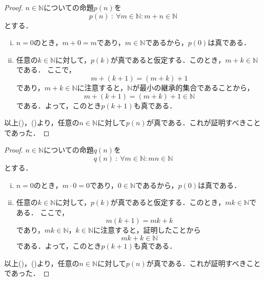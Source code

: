 \documentclass[a4paper,10pt,fleqn]{ltjsarticle}
\begin{document}
\begin{tleftbar}
    \begin{proof}
        $n \in \mathbb{N}$についての命題$p(n)$を
        \[
            p(n) ~{:}~ \forall m \in \mathbb{N} \colon  m+n \in \mathbb{N}
        \]
        とする．
        \begin{enumerate}[(i)]
            \item $n=0$のとき，$m+0=m$であり，$m \in \mathbb{N}$であるから，$p(0)$は真である．
            \item 任意の$k \in \mathbb{N}$に対して，$p(k)$が真であると仮定する．このとき，$m+k \in \mathbb{N}$である．
                  ここで，
                  \[
                      m+(k+1)=(m+k)+1
                  \] であり，$m+k \in \mathbb{N}$に注意すると，$\mathbb{N}$が最小の継承的集合であることから，
                  \[
                      m+(k+1)=(m+k)+1  \in \mathbb{N}
                  \]
                  である．よって，このとき$p(k+1)$も真である．
        \end{enumerate}
        以上()，()より，任意の$n \in \mathbb{N}$に対して$p(n)$が真である．これが証明すべきことであった．
    \end{proof}
\end{tleftbar}



\begin{tleftbar}
    \begin{proof}
        $n \in \mathbb{N}$についての命題$q(n)$を
        \[
            q(n) ~{:}~ \forall m \in \mathbb{N} \colon  mn \in \mathbb{N}
        \]
        とする．
        \begin{enumerate}[(i)]
            \item $n=0$のとき，$m \cdot 0=0$であり，$0 \in \mathbb{N}$であるから，$p(0)$は真である．
            \item 任意の$k \in \mathbb{N}$に対して，$p(k)$が真であると仮定する．このとき，$mk \in \mathbb{N}$である．
                  ここで，
                  \[
                      m(k+1)=mk + k
                  \] であり，$mk \in \mathbb{N}$，$k \in \mathbb{N}$に注意すると，証明したことから
                  \[
                      mk + k   \in \mathbb{N}
                  \]
                  である．よって，このとき$p(k+1)$も真である．
        \end{enumerate}
        以上()，()より，任意の$n \in \mathbb{N}$に対して$p(n)$が真である．これが証明すべきことであった．
    \end{proof}
\end{tleftbar}
\end{document}

